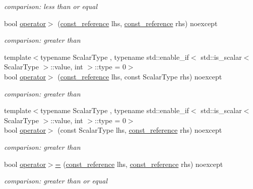 \begin{DoxyCompactItemize}
\begin{DoxyCompactList}\small\item\em comparison\+: less than or equal \end{DoxyCompactList}\item 
bool \mbox{\hyperlink{classnlohmann_1_1basic__json_a87db51b6b936fb2ea293cdbc8702dcb8}{operator$>$}} (\mbox{\hyperlink{classnlohmann_1_1basic__json_a4057c5425f4faacfe39a8046871786ca}{const\+\_\+reference}} lhs, \mbox{\hyperlink{classnlohmann_1_1basic__json_a4057c5425f4faacfe39a8046871786ca}{const\+\_\+reference}} rhs) noexcept
\begin{DoxyCompactList}\small\item\em comparison\+: greater than \end{DoxyCompactList}\item 
{\footnotesize template$<$typename Scalar\+Type , typename std\+::enable\+\_\+if$<$ std\+::is\+\_\+scalar$<$ Scalar\+Type $>$\+::value, int $>$\+::type  = 0$>$ }\\bool \mbox{\hyperlink{classnlohmann_1_1basic__json_a412895af9a582869a4d369a64fb1b6d6}{operator$>$}} (\mbox{\hyperlink{classnlohmann_1_1basic__json_a4057c5425f4faacfe39a8046871786ca}{const\+\_\+reference}} lhs, const Scalar\+Type rhs) noexcept
\begin{DoxyCompactList}\small\item\em comparison\+: greater than \end{DoxyCompactList}\item 
{\footnotesize template$<$typename Scalar\+Type , typename std\+::enable\+\_\+if$<$ std\+::is\+\_\+scalar$<$ Scalar\+Type $>$\+::value, int $>$\+::type  = 0$>$ }\\bool \mbox{\hyperlink{classnlohmann_1_1basic__json_a124c319566198d9f092c5bebea46ce77}{operator$>$}} (const Scalar\+Type lhs, \mbox{\hyperlink{classnlohmann_1_1basic__json_a4057c5425f4faacfe39a8046871786ca}{const\+\_\+reference}} rhs) noexcept
\begin{DoxyCompactList}\small\item\em comparison\+: greater than \end{DoxyCompactList}\item 
bool \mbox{\hyperlink{classnlohmann_1_1basic__json_a74a943800c7f103d0990d7eef82c6453}{operator$>$=}} (\mbox{\hyperlink{classnlohmann_1_1basic__json_a4057c5425f4faacfe39a8046871786ca}{const\+\_\+reference}} lhs, \mbox{\hyperlink{classnlohmann_1_1basic__json_a4057c5425f4faacfe39a8046871786ca}{const\+\_\+reference}} rhs) noexcept
\begin{DoxyCompactList}\small\item\em comparison\+: greater than or equal \end{DoxyCompactList}\item 

\end{DoxyCompactItemize}

